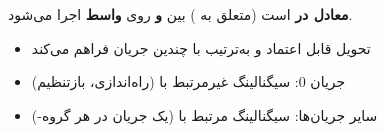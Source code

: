 

 \textbf{معادل  در } است (متعلق به )  بین \textbf{ و } روی \textbf{واسط } اجرا می‌شود.



\begin{itemize}
\tightlist
\item
   تحویل قابل اعتماد و به‌ترتیب با چندین جریان فراهم می‌کند
\item
  جریان 0: سیگنالینگ غیرمرتبط با  (راه‌اندازی، بازتنظیم)
\item
  سایر جریان‌ها: سیگنالینگ مرتبط با  (یک جریان در هر گروه-)
\end{itemize}



